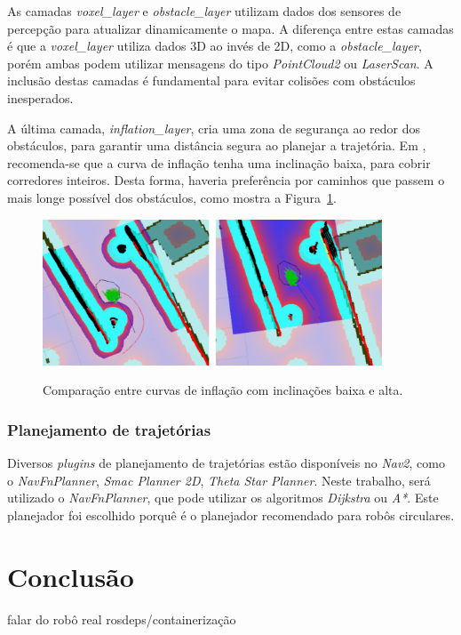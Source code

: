 \documentclass[repeatfields,xlists,xpacks,oneside,yearsonly]{ufrgscca}
\begin{document}
As camadas \textit{voxel\_layer} e \textit{obstacle\_layer} utilizam dados dos
sensores de percepção para atualizar dinamicamente o mapa.
A diferença entre estas camadas é que a \textit{voxel\_layer} utiliza dados 3D
ao invés de 2D, como a \textit{obstacle\_layer}, porém ambas podem utilizar mensagens
do tipo \textit{PointCloud2} ou \textit{LaserScan}.
A inclusão destas camadas é fundamental para evitar colisões com obstáculos
inesperados.

A última camada, \textit{inflation\_layer}, cria uma zona de segurança ao redor
dos obstáculos, para garantir uma distância segura ao planejar a trajetória.
Em \textcite{ros_tuning_guide}, recomenda-se que a curva de inflação tenha uma
inclinação baixa, para cobrir corredores inteiros.
Desta forma, haveria preferência por caminhos que passem o mais longe possível
dos obstáculos, como mostra a Figura~\ref{fig:inflation_layer}.

\begin{figure}[htbp]
    {
        \centering
        \caption{Comparação entre curvas de inflação com inclinações baixa e alta.}
        \label{fig:inflation_layer}
        \includegraphics[width=0.9\textwidth]{inflation_layer.png}\\
    }
    {}
\end{figure}

\subsection{Planejamento de trajetórias}

Diversos \textit{plugins} de planejamento de trajetórias estão disponíveis no \textit{Nav2},
como o \textit{NavFnPlanner}, \textit{Smac Planner 2D}, \textit{Theta Star Planner}.
Neste trabalho, será utilizado o \textit{NavFnPlanner}, que pode utilizar os algoritmos
\textit{Dijkstra} ou \textit{A*}.
Este planejador foi escolhido porquê é o planejador recomendado para robôs circulares.

\chapter{Conclusão}
\label{conclusao}

falar do robô real
rosdeps/containerização


\printbibliography

%
%
%
\end{document}
